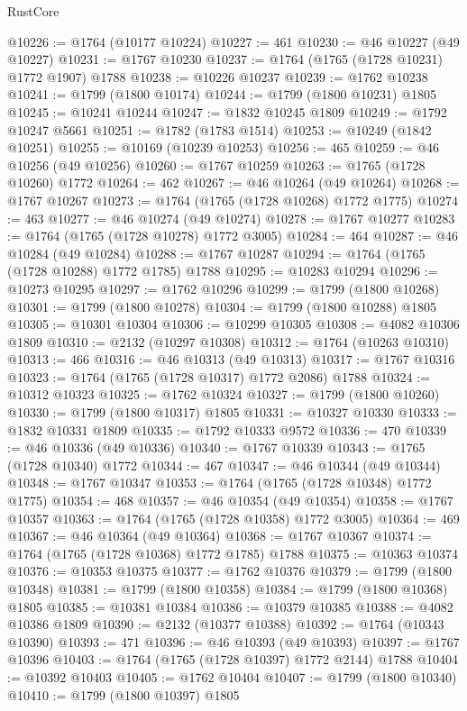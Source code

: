 \begin{lexlean}{RustCore}
\begin{coremodule}
@10226 := @1764 (@10177 @10224)
@10227 := 461
@10230 := @46 @10227 (@49 @10227)
@10231 := @1767 @10230
@10237 := @1764 (@1765 (@1728 @10231) @1772 @1907) @1788
@10238 := @10226 @10237
@10239 := @1762 @10238
@10241 := @1799 (@1800 @10174)
@10244 := @1799 (@1800 @10231) @1805
@10245 := @10241 @10244
@10247 := @1832 @10245 @1809
@10249 := @1792 @10247 @5661
@10251 := @1782 (@1783 @1514)
@10253 := @10249 (@1842 @10251)
@10255 := @10169 (@10239 @10253)
@10256 := 465
@10259 := @46 @10256 (@49 @10256)
@10260 := @1767 @10259
@10263 := @1765 (@1728 @10260) @1772
@10264 := 462
@10267 := @46 @10264 (@49 @10264)
@10268 := @1767 @10267
@10273 := @1764 (@1765 (@1728 @10268) @1772 @1775)
@10274 := 463
@10277 := @46 @10274 (@49 @10274)
@10278 := @1767 @10277
@10283 := @1764 (@1765 (@1728 @10278) @1772 @3005)
@10284 := 464
@10287 := @46 @10284 (@49 @10284)
@10288 := @1767 @10287
@10294 := @1764 (@1765 (@1728 @10288) @1772 @1785) @1788
@10295 := @10283 @10294
@10296 := @10273 @10295
@10297 := @1762 @10296
@10299 := @1799 (@1800 @10268)
@10301 := @1799 (@1800 @10278)
@10304 := @1799 (@1800 @10288) @1805
@10305 := @10301 @10304
@10306 := @10299 @10305
@10308 := @4082 @10306 @1809
@10310 := @2132 (@10297 @10308)
@10312 := @1764 (@10263 @10310)
@10313 := 466
@10316 := @46 @10313 (@49 @10313)
@10317 := @1767 @10316
@10323 := @1764 (@1765 (@1728 @10317) @1772 @2086) @1788
@10324 := @10312 @10323
@10325 := @1762 @10324
@10327 := @1799 (@1800 @10260)
@10330 := @1799 (@1800 @10317) @1805
@10331 := @10327 @10330
@10333 := @1832 @10331 @1809
@10335 := @1792 @10333 @9572
@10336 := 470
@10339 := @46 @10336 (@49 @10336)
@10340 := @1767 @10339
@10343 := @1765 (@1728 @10340) @1772
@10344 := 467
@10347 := @46 @10344 (@49 @10344)
@10348 := @1767 @10347
@10353 := @1764 (@1765 (@1728 @10348) @1772 @1775)
@10354 := 468
@10357 := @46 @10354 (@49 @10354)
@10358 := @1767 @10357
@10363 := @1764 (@1765 (@1728 @10358) @1772 @3005)
@10364 := 469
@10367 := @46 @10364 (@49 @10364)
@10368 := @1767 @10367
@10374 := @1764 (@1765 (@1728 @10368) @1772 @1785) @1788
@10375 := @10363 @10374
@10376 := @10353 @10375
@10377 := @1762 @10376
@10379 := @1799 (@1800 @10348)
@10381 := @1799 (@1800 @10358)
@10384 := @1799 (@1800 @10368) @1805
@10385 := @10381 @10384
@10386 := @10379 @10385
@10388 := @4082 @10386 @1809
@10390 := @2132 (@10377 @10388)
@10392 := @1764 (@10343 @10390)
@10393 := 471
@10396 := @46 @10393 (@49 @10393)
@10397 := @1767 @10396
@10403 := @1764 (@1765 (@1728 @10397) @1772 @2144) @1788
@10404 := @10392 @10403
@10405 := @1762 @10404
@10407 := @1799 (@1800 @10340)
@10410 := @1799 (@1800 @10397) @1805

\end{coremodule}
\end{lexlean}
